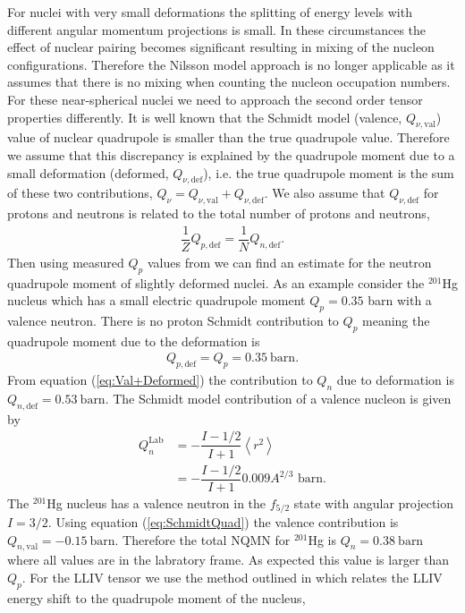 \documentclass[10pt,a4paper, twoside, openright]{report}
\begin{document}
For nuclei with very small deformations the splitting of energy levels with different angular momentum projections is small.
 In these circumstances the effect of nuclear pairing becomes significant resulting in mixing of the nucleon configurations. Therefore the Nilsson model approach is no longer applicable as it assumes that there is no mixing when counting the nucleon occupation numbers. For these near-spherical nuclei we need to approach the second order tensor properties differently.  It is well known that the Schmidt model (valence, $Q_{\nu, \text{val}}$) value of nuclear quadrupole is smaller than the true quadrupole value. Therefore we assume that this discrepancy is explained by the quadrupole moment due to a small deformation (deformed, $Q_{\nu, \text{def}}$), i.e. the true quadrupole moment is the sum of these two contributions, $Q_{\nu} = Q_{\nu, \text{val}} + Q_{\nu, \text{def}}$. We also assume that $Q_{\nu,\text{def}}$ for protons and neutrons is related to the total number of protons and neutrons,
\begin{align} \label{eq:Val+Deformed}
\dfrac{1}{Z}Q_{p, \text{def}} = \dfrac{1}{N}Q_{n,\text{def}}.
\end{align}
Then using measured $Q_{p}$ values from \cite{Stone2005} we can find an estimate for the neutron quadrupole moment of slightly deformed nuclei. As an example consider the $^{201}$Hg nucleus which has a small electric quadrupole moment $Q_{p} = 0.35 $ barn with a valence neutron. There is no proton Schmidt contribution to $Q_{p}$ meaning the quadrupole moment due to the deformation is 
\begin{align*}
Q_{p,\text{def}} = Q_{p} = 0.35 \ \text{barn}.
\end{align*}
From equation (\ref{eq:Val+Deformed}) the contribution to $Q_{n}$ due to deformation is $Q_{n,\text{def}} = 0.53 \ \text{barn}$. The Schmidt model contribution of a valence nucleon is given by \cite{BohrMottVol1, Flambaum2016}
\begin{align} \label{eq:SchmidtQuad}
Q_{n}^{\text{Lab}} &= -\dfrac{I - 1/2}{I + 1}\left<r^2\right> \\
&= -\dfrac{I - 1/2}{I + 1}0.009A^{2/3} \text{ barn}.
\end{align}
 The $^{201}$Hg nucleus has a valence neutron in the $f_{5/2}$ state with angular projection $I =3/2$. Using equation (\ref{eq:SchmidtQuad}) the valence contribution is $Q_{n,\text{val}} = -0.15 \ \text{barn}$. Therefore the total NQMN for $^{201}$Hg is $Q_{n} = 0.38 \ \text{barn}$ where all values are in the labratory frame. As expected this value is larger than $Q_{p}$. For the LLIV tensor we use the method outlined in \cite{Flambaum2016} which relates the LLIV energy shift to the quadrupole moment of the nucleus,
\end{document}
